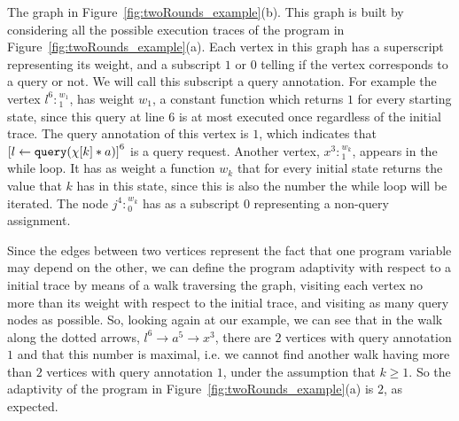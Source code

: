 \begin{example}[twoRounds]
      The graph in Figure~\ref{fig:twoRounds_example}(b). This graph is built by considering all the possible execution traces of the program in   Figure~\ref{fig:twoRounds_example}(a).
      Each vertex in this graph has a superscript representing its weight, and a subscript $1$ or $0$ telling if the vertex corresponds to a query or not. We will call this subscript a query annotation. 
      For example the vertex $l^{6}:{}^{w_1}_1$, 
      has weight $w_1$, a constant function which returns $1$ for every starting state, since 
      this query at line $6$ is at most executed once regardless of the initial trace.
      The query annotation of this vertex is $1$, which  indicates that 
      $\clabel{\assign{l}{\query(\chi[k] * a)}}^6$ is a query request.
      Another vertex, $x^{3}:{}^{w_k}_1$, appears in the while loop. 
      It has as weight a function $w_k$ that for every initial state returns the value that $k$ has in this state, since this is also the number the while loop will be iterated. 
      The node $j^{4}:{}^{w_k}_0$ has as a subscript $0$ representing a non-query assignment.
      
      
      Since the edges between two vertices represent the fact that one program variable may depend on the other,
      we can define the program adaptivity with respect to a initial trace by means of a walk traversing the graph, visiting each vertex no more than its weight with respect to the initial trace, and visiting as many query nodes as possible.
      So, looking again at our example, we can see that
      in the walk along the dotted arrows,  $l^{6} \to a^5 \to x^3 $, there are $2$ vertices with query annotation $1$ and that this number is maximal, i.e. we cannot find another walk having more than $2$ vertices with query annotation $1$, under the assumption that $k \geq 1$. So the adaptivity of the program in Figure~\ref{fig:twoRounds_example}(a)  is $2$,
      as expected.


\end{example}
